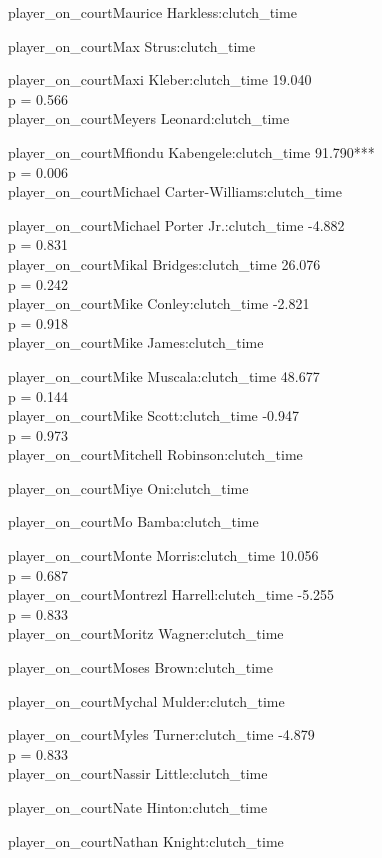 \documentclass[
  landscape]{article}
\begin{document}
player\_on\_courtMaurice Harkless:clutch\_time

player\_on\_courtMax Strus:clutch\_time

player\_on\_courtMaxi Kleber:clutch\_time 19.040\\
p = 0.566\\
player\_on\_courtMeyers Leonard:clutch\_time

player\_on\_courtMfiondu Kabengele:clutch\_time 91.790***\\
p = 0.006\\
player\_on\_courtMichael Carter-Williams:clutch\_time

player\_on\_courtMichael Porter Jr.:clutch\_time -4.882\\
p = 0.831\\
player\_on\_courtMikal Bridges:clutch\_time 26.076\\
p = 0.242\\
player\_on\_courtMike Conley:clutch\_time -2.821\\
p = 0.918\\
player\_on\_courtMike James:clutch\_time

player\_on\_courtMike Muscala:clutch\_time 48.677\\
p = 0.144\\
player\_on\_courtMike Scott:clutch\_time -0.947\\
p = 0.973\\
player\_on\_courtMitchell Robinson:clutch\_time

player\_on\_courtMiye Oni:clutch\_time

player\_on\_courtMo Bamba:clutch\_time

player\_on\_courtMonte Morris:clutch\_time 10.056\\
p = 0.687\\
player\_on\_courtMontrezl Harrell:clutch\_time -5.255\\
p = 0.833\\
player\_on\_courtMoritz Wagner:clutch\_time

player\_on\_courtMoses Brown:clutch\_time

player\_on\_courtMychal Mulder:clutch\_time

player\_on\_courtMyles Turner:clutch\_time -4.879\\
p = 0.833\\
player\_on\_courtNassir Little:clutch\_time

player\_on\_courtNate Hinton:clutch\_time

player\_on\_courtNathan Knight:clutch\_time
\end{document}
